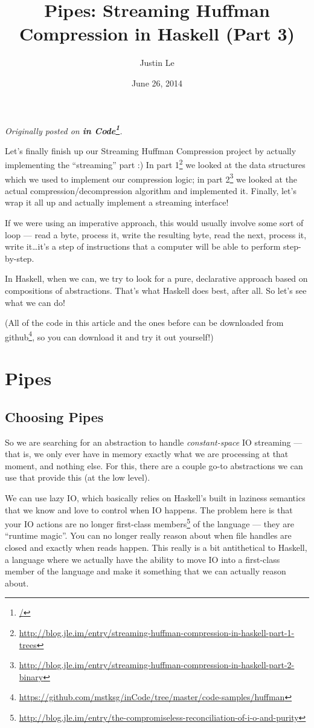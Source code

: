 \documentclass[]{article}
\title{Pipes: Streaming Huffman Compression in Haskell (Part 3)}
\author{Justin Le}
\date{June 26, 2014}
\renewcommand{\href}[2]{#2\footnote{\url{#1}}}
\begin{document}
\maketitle

\emph{Originally posted on \textbf{\href{/}{in Code}}.}

Let's finally finish up our Streaming Huffman Compression project by
actually implementing the ``streaming'' part :) In
\href{http://blog.jle.im/entry/streaming-huffman-compression-in-haskell-part-1-trees}{part
1} we looked at the data structures which we used to implement our
compression logic; in
\href{http://blog.jle.im/entry/streaming-huffman-compression-in-haskell-part-2-binary}{part
2} we looked at the actual compression/decompression algorithm and
implemented it. Finally, let's wrap it all up and actually implement a
streaming interface!

If we were using an imperative approach, this would usually involve some
sort of loop --- read a byte, process it, write the resulting byte, read
the next, process it, write it\ldots{}it's a step of instructions that a
computer will be able to perform step-by-step.

In Haskell, when we can, we try to look for a pure, declarative approach
based on compositions of abstractions. That's what Haskell does best,
after all. So let's see what we can do!

(All of the code in this article and the ones before can be downloaded
\href{https://github.com/mstksg/inCode/tree/master/code-samples/huffman}{from
github}, so you can download it and try it out yourself!)

\section{Pipes}\label{pipes}

\subsection{Choosing Pipes}\label{choosing-pipes}

So we are searching for an abstraction to handle \emph{constant-space}
IO streaming --- that is, we only ever have in memory exactly what we
are processing at that moment, and nothing else. For this, there are a
couple go-to abstractions we can use that provide this (at the low
level).

We can use lazy IO, which basically relies on Haskell's built in
laziness semantics that we know and love to control when IO happens. The
problem here is that your IO actions are no longer
\href{http://blog.jle.im/entry/the-compromiseless-reconciliation-of-i-o-and-purity}{first-class
members} of the language --- they are ``runtime magic''. You can no
longer really reason about when file handles are closed and exactly when
reads happen. This really is a bit antithetical to Haskell, a language
where we actually have the ability to move IO into a first-class member
of the language and make it something that we can actually reason about.
\end{document}
